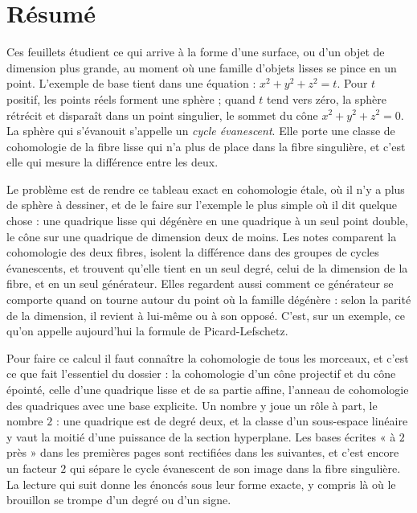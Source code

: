 \documentclass[11pt,a4paper]{article}
\begin{document}
\section*{Résumé}

\begin{resume}
Ces feuillets étudient ce qui arrive à la forme d'une surface, ou d'un objet
de dimension plus grande, au moment où une famille d'objets lisses se
pince en un point. L'exemple de base tient dans une équation :
$x^{2} + y^{2} + z^{2} = t$. Pour $t$ positif, les points réels forment une
sphère ; quand $t$ tend vers zéro, la sphère rétrécit et disparaît dans un
point singulier, le sommet du cône $x^{2} + y^{2} + z^{2} = 0$. La sphère
qui s'évanouit s'appelle un \emph{cycle évanescent}. Elle porte une classe de
cohomologie de la fibre lisse qui n'a plus de place dans la fibre singulière,
et c'est elle qui mesure la différence entre les deux.

Le problème est de rendre ce tableau exact en cohomologie étale, où il n'y a
plus de sphère à dessiner, et de le faire sur l'exemple le plus simple où il
dit quelque chose : une quadrique lisse qui dégénère en une quadrique à un
seul point double, le cône sur une quadrique de dimension deux de moins.
Les notes comparent la cohomologie des deux fibres, isolent la différence
dans des groupes de cycles évanescents, et trouvent qu'elle tient en un seul
degré, celui de la dimension de la fibre, et en un seul générateur. Elles
regardent aussi comment ce générateur se comporte quand on tourne autour du
point où la famille dégénère : selon la parité de la dimension, il revient
à lui-même ou à son opposé. C'est, sur un exemple, ce qu'on appelle
aujourd'hui la formule de Picard-Lefschetz.

Pour faire ce calcul il faut connaître la cohomologie de tous les
morceaux, et c'est ce que fait l'essentiel du dossier : la cohomologie d'un
cône projectif et du cône épointé, celle d'une quadrique lisse et de sa
partie affine, l'anneau de cohomologie des quadriques avec une base
explicite. Un nombre y joue un rôle à part, le nombre $2$ : une quadrique
est de degré deux, et la classe d'un sous-espace linéaire y vaut la moitié
d'une puissance de la section hyperplane. Les bases écrites « à $2$
près » dans les premières pages sont rectifiées dans les suivantes, et
c'est encore un facteur $2$ qui sépare le cycle évanescent de son image dans
la fibre singulière. La lecture qui suit donne les énoncés sous leur forme
exacte, y compris là où le brouillon se trompe d'un degré ou d'un signe.


\end{resume}
\end{document}
